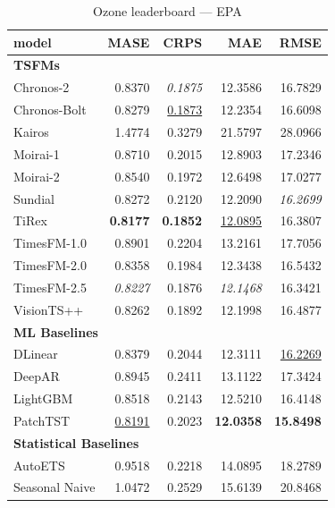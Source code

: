 \begin{table}[H]
\caption{Ozone leaderboard --- EPA}
\centering
\begin{small}
\begin{tabular}{lrrrr}
\toprule
model & MASE & CRPS & MAE & RMSE \\
\midrule
\multicolumn{5}{l}{\textbf{TSFMs}} \\
Chronos-2 & 0.8370 & \textit{0.1875} & 12.3586 & 16.7829 \\
Chronos-Bolt & 0.8279 & \underline{0.1873} & 12.2354 & 16.6098 \\
Kairos & 1.4774 & 0.3279 & 21.5797 & 28.0966 \\
Moirai-1 & 0.8710 & 0.2015 & 12.8903 & 17.2346 \\
Moirai-2 & 0.8540 & 0.1972 & 12.6498 & 17.0277 \\
Sundial & 0.8272 & 0.2120 & 12.2090 & \textit{16.2699} \\
TiRex & \textbf{0.8177} & \textbf{0.1852} & \underline{12.0895} & 16.3807 \\
TimesFM-1.0 & 0.8901 & 0.2204 & 13.2161 & 17.7056 \\
TimesFM-2.0 & 0.8358 & 0.1984 & 12.3438 & 16.5432 \\
TimesFM-2.5 & \textit{0.8227} & 0.1876 & \textit{12.1468} & 16.3421 \\
VisionTS++ & 0.8262 & 0.1892 & 12.1998 & 16.4877 \\
\midrule
\multicolumn{5}{l}{\textbf{ML Baselines}} \\
DLinear & 0.8379 & 0.2044 & 12.3111 & \underline{16.2269} \\
DeepAR & 0.8945 & 0.2411 & 13.1122 & 17.3424 \\
LightGBM & 0.8518 & 0.2143 & 12.5210 & 16.4148 \\
PatchTST & \underline{0.8191} & 0.2023 & \textbf{12.0358} & \textbf{15.8498} \\
\midrule
\multicolumn{5}{l}{\textbf{Statistical Baselines}} \\
AutoETS & 0.9518 & 0.2218 & 14.0895 & 18.2789 \\
Seasonal Naive & 1.0472 & 0.2529 & 15.6139 & 20.8468 \\
\bottomrule
\end{tabular}
\end{small}
\end{table}